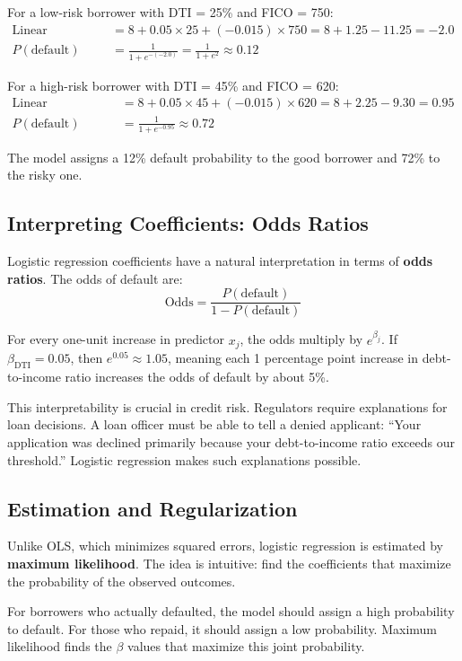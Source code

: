 \documentclass[11pt,a4paper]{article}
\newcommand{\keyword}[1]{\textbf{\textcolor{AccentOrange}{#1}}}
\begin{document}
For a low-risk borrower with DTI = 25\% and FICO = 750:
\begin{align*}
\text{Linear combination} &= 8 + 0.05 \times 25 + (-0.015) \times 750 = 8 + 1.25 - 11.25 = -2.0 \\
P(\text{default}) &= \frac{1}{1 + e^{-(-2.0)}} = \frac{1}{1 + e^{2}} \approx 0.12
\end{align*}

For a high-risk borrower with DTI = 45\% and FICO = 620:
\begin{align*}
\text{Linear combination} &= 8 + 0.05 \times 45 + (-0.015) \times 620 = 8 + 2.25 - 9.30 = 0.95 \\
P(\text{default}) &= \frac{1}{1 + e^{-0.95}} \approx 0.72
\end{align*}

The model assigns a 12\% default probability to the good borrower and 72\% to the risky one.

\subsection{Interpreting Coefficients: Odds Ratios}

Logistic regression coefficients have a natural interpretation in terms of \keyword{odds ratios}. The odds of default are:
\[
\text{Odds} = \frac{P(\text{default})}{1 - P(\text{default})}
\]

For every one-unit increase in predictor $x_j$, the odds multiply by $e^{\beta_j}$. If $\beta_{\text{DTI}} = 0.05$, then $e^{0.05} \approx 1.05$, meaning each 1 percentage point increase in debt-to-income ratio increases the odds of default by about 5\%.

This interpretability is crucial in credit risk. Regulators require explanations for loan decisions. A loan officer must be able to tell a denied applicant: ``Your application was declined primarily because your debt-to-income ratio exceeds our threshold.'' Logistic regression makes such explanations possible.

\subsection{Estimation and Regularization}

Unlike OLS, which minimizes squared errors, logistic regression is estimated by \keyword{maximum likelihood}. The idea is intuitive: find the coefficients that maximize the probability of the observed outcomes.

For borrowers who actually defaulted, the model should assign a high probability to default. For those who repaid, it should assign a low probability. Maximum likelihood finds the $\beta$ values that maximize this joint probability.
\end{document}

